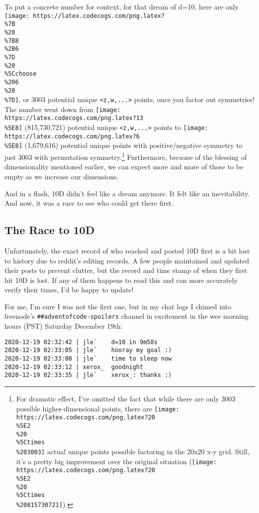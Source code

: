 \documentclass[]{article}
\begin{document}
To put a concrete number for context, for that dream of d=10, here are only
\texttt{[image: https://latex.codecogs.com/png.latex?\\\%7B\\\%20\\\%7B8\\\%2B6\\\%7D\\\%20\\\%5Cchoose\\\%206\\\%20\\\%7D]},
or 3003 potential unique \texttt{\textless{}z,w,...\textgreater{}} points, once
you factor out symmetries! The number went down from
\texttt{[image: https://latex.codecogs.com/png.latex?13\\\%5E8]} (815,730,721)
potential unique \texttt{\textless{}z,w,...\textgreater{}} points to
\texttt{[image: https://latex.codecogs.com/png.latex?6\\\%5E8]} (1,679,616)
potential unique points with positive/negative symmetry to just 3003 with
permutation symmetry.\footnote{For dramatic effect, I've omitted the fact that
  while there are only 3003 possible higher-dimensional points, there are
  \texttt{[image: https://latex.codecogs.com/png.latex?20\\\%5E2\\\%20\\\%5Ctimes\\\%203003]}
  actual unique points possible factoring in the 20x20 x-y grid. Still, it's a
  pretty big improvement over the original situation
  (\texttt{[image: https://latex.codecogs.com/png.latex?20\\\%5E2\\\%20\\\%5Ctimes\\\%20815730721]}).}
Furthermore, because of the blessing of dimensionality mentioned earlier, we can
expect more and more of those to be empty as we increase our dimensions.

And in a flash, 10D didn't feel like a dream anymore. It felt like an
inevitability. And now, it was a race to see who could get there first.

\hypertarget{the-race-to-10d}{%
\subsection{The Race to 10D}\label{the-race-to-10d}}

Unfortunately, the exact record of who reached and posted 10D first is a bit
lost to history due to reddit's editing records. A few people maintained and
updated their posts to prevent clutter, but the record and time stamp of when
they first hit 10D is lost. If any of them happens to read this and can more
accurately verify their times, I'd be happy to update!

For me, I'm sure I was not the first one, but in my chat logs I chimed into
freenode's \texttt{\#\#adventofcode-spoilers} channel in excitement in the wee
morning hours (PST) Saturday December 19th:

\begin{verbatim}
2020-12-19 02:32:42 | jle`    d=10 in 9m58s
2020-12-19 02:33:05 | jle`    hooray my goal :)
2020-12-19 02:33:08 | jle`    time to sleep now
2020-12-19 02:33:12 | xerox_  goodnight
2020-12-19 02:33:35 | jle`    xerox_: thanks :)
\end{verbatim}
\end{document}

